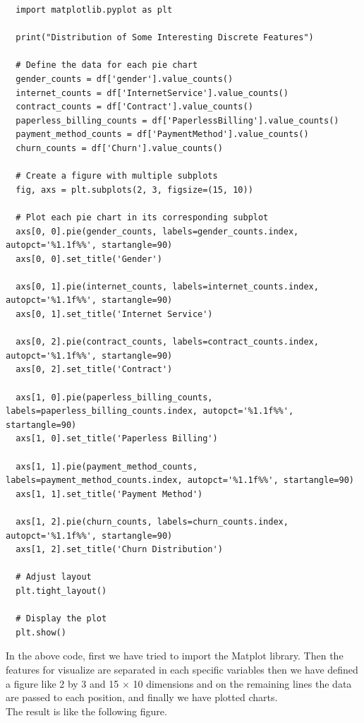 \documentclass[12pt]{article}
\begin{document}
\newpage
\begin{lstlisting}
  import matplotlib.pyplot as plt

  print("Distribution of Some Interesting Discrete Features")
  
  # Define the data for each pie chart
  gender_counts = df['gender'].value_counts()
  internet_counts = df['InternetService'].value_counts()
  contract_counts = df['Contract'].value_counts()
  paperless_billing_counts = df['PaperlessBilling'].value_counts()
  payment_method_counts = df['PaymentMethod'].value_counts()
  churn_counts = df['Churn'].value_counts()
  
  # Create a figure with multiple subplots
  fig, axs = plt.subplots(2, 3, figsize=(15, 10))
  
  # Plot each pie chart in its corresponding subplot
  axs[0, 0].pie(gender_counts, labels=gender_counts.index, autopct='%1.1f%%', startangle=90)
  axs[0, 0].set_title('Gender')
  
  axs[0, 1].pie(internet_counts, labels=internet_counts.index, autopct='%1.1f%%', startangle=90)
  axs[0, 1].set_title('Internet Service')
  
  axs[0, 2].pie(contract_counts, labels=contract_counts.index, autopct='%1.1f%%', startangle=90)
  axs[0, 2].set_title('Contract')
  
  axs[1, 0].pie(paperless_billing_counts, labels=paperless_billing_counts.index, autopct='%1.1f%%', startangle=90)
  axs[1, 0].set_title('Paperless Billing')
  
  axs[1, 1].pie(payment_method_counts, labels=payment_method_counts.index, autopct='%1.1f%%', startangle=90)
  axs[1, 1].set_title('Payment Method')
  
  axs[1, 2].pie(churn_counts, labels=churn_counts.index, autopct='%1.1f%%', startangle=90)
  axs[1, 2].set_title('Churn Distribution')
  
  # Adjust layout
  plt.tight_layout()
  
  # Display the plot
  plt.show()  
  \end{lstlisting}
  \vspace{\baselineskip}
In the above code, first we have tried to import the Matplot library. Then the features for visualize are separated in each specific variables then we have defined a figure like 2 by 3 and 15 $\times$ 10 dimensions and on the remaining lines the data are passed to each position, and finally we have plotted charts.\\
The result is like the following figure.
\newline
\end{document}
